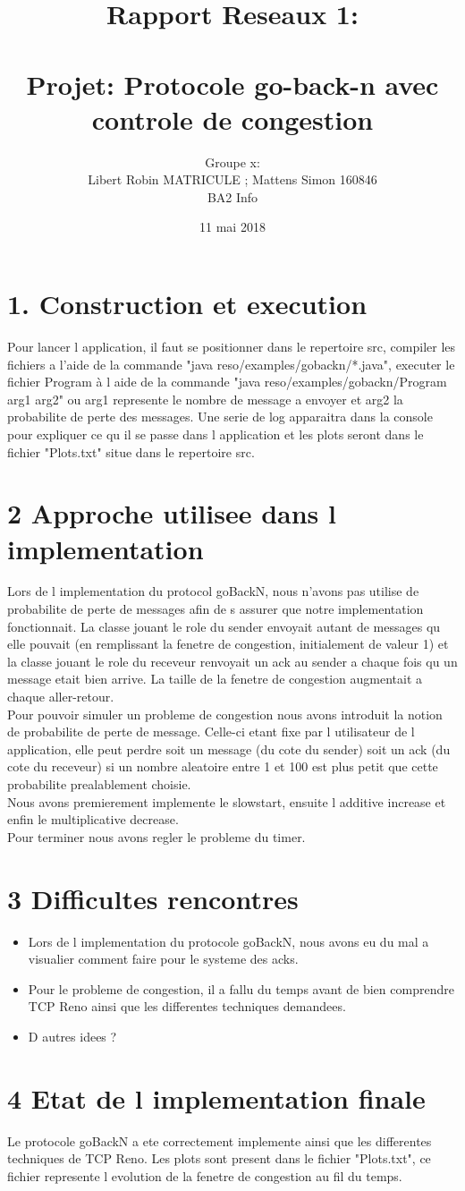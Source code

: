 \documentclass{report}
\title{Rapport Reseaux 1: \\ ~~\\ Projet: Protocole go-back-n avec controle de congestion}
\author{Groupe x: \\ Libert Robin MATRICULE ; Mattens Simon 160846 \\ BA2 Info}
\date{11 mai 2018}
\begin{document}
\maketitle
\section*{1. Construction et execution}
\hspace*{0,5cm} Pour lancer l application, il faut se positionner dans le repertoire src, compiler les fichiers a l'aide de la commande "java reso/examples/gobackn/*.java", executer le fichier Program à l aide de la commande "java reso/examples/gobackn/Program arg1 arg2" ou arg1 represente le nombre de message a envoyer et arg2 la probabilite de perte des messages. Une serie de log apparaitra dans la console pour expliquer ce qu il se passe dans l application et les plots seront dans le fichier "Plots.txt" situe dans le repertoire src.
\section*{2 Approche utilisee dans l implementation}
\hspace*{0,5cm} Lors de l implementation du protocol goBackN, nous n'avons pas utilise de probabilite de perte de messages afin de s assurer que notre implementation fonctionnait. La classe jouant le role du sender envoyait autant de messages qu elle pouvait (en remplissant la fenetre de congestion, initialement de valeur 1) et la classe jouant le role du receveur renvoyait un ack au sender a chaque fois qu un message etait bien arrive. La taille de la fenetre de congestion augmentait a chaque aller-retour.
\\Pour pouvoir simuler un probleme de congestion nous avons introduit la notion de probabilite de perte de message. Celle-ci etant fixe par l utilisateur de l application, elle peut perdre soit un message (du cote du sender) soit un ack (du cote du receveur) si un nombre aleatoire entre 1 et 100 est plus petit que cette probabilite prealablement choisie.
\\Nous avons premierement implemente le slowstart, ensuite l additive increase et enfin le multiplicative decrease.
\\Pour terminer nous avons regler le probleme du timer.
\section*{3 Difficultes rencontres}
\begin{itemize}
\item Lors de l implementation du protocole goBackN, nous avons eu du mal a visualier comment faire pour le systeme des acks.
\item Pour le probleme de congestion, il a fallu du temps avant de bien comprendre TCP Reno ainsi que les differentes techniques demandees.
\item D autres idees ? 
\end{itemize}
\section*{ 4 Etat de l implementation finale }
\hspace*{0,5cm} Le protocole goBackN a ete correctement implemente ainsi que les differentes techniques de TCP Reno. Les plots sont present dans le fichier "Plots.txt", ce fichier represente l evolution de la fenetre de congestion au fil du temps.
\end{document}
